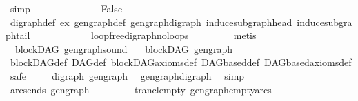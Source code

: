 \begin{isabellebody}
\ simp\isanewline
\ \ \ \ \ \isamarkupfalse%
\isanewline
\ \ \ \ \ \isamarkupfalse%
\ \isamarkupfalse%
\ False\isanewline
\ \ \ \ \ \ \ \isamarkupfalse%
\ digraph{\isacharunderscore}{\kern0pt}def\ ex\ gen{\isacharunderscore}{\kern0pt}graph{\isacharunderscore}{\kern0pt}def\ gen{\isacharunderscore}{\kern0pt}graph{\isacharunderscore}{\kern0pt}digraph\ induce{\isacharunderscore}{\kern0pt}subgraph{\isacharunderscore}{\kern0pt}head\ induce{\isacharunderscore}{\kern0pt}subgraph{\isacharunderscore}{\kern0pt}tail\ \isanewline
\ \ \ \ \ \ \ \ \ \ \ loopfree{\isacharunderscore}{\kern0pt}digraph{\isachardot}{\kern0pt}no{\isacharunderscore}{\kern0pt}loops\isanewline
\ \ \ \ \ \ \ \isamarkupfalse%
\ metis\isanewline
\ \ \ \isamarkupfalse%
%
\endisatagproof
{\isafoldproof}%
%
\isadelimproof
\isanewline
%
\endisadelimproof
\isanewline
\isanewline
{}\isamarkupfalse%
\ {\isacharparenleft}{\kern0pt}\ blockDAG{\isacharparenright}{\kern0pt}\ gen{\isacharunderscore}{\kern0pt}graph{\isacharunderscore}{\kern0pt}sound{\isacharcolon}{\kern0pt}\ \isanewline
\ \ {\isachardoublequoteopen}blockDAG\ {\isacharparenleft}{\kern0pt}gen{\isacharunderscore}{\kern0pt}graph{\isacharparenright}{\kern0pt}{\isachardoublequoteclose}\isanewline
%
\isadelimproof
\ \ %
\endisadelimproof
%
\isatagproof
{}\isamarkupfalse%
\ blockDAG{\isacharunderscore}{\kern0pt}def\ DAG{\isacharunderscore}{\kern0pt}def\ blockDAG{\isacharunderscore}{\kern0pt}axioms{\isacharunderscore}{\kern0pt}def\ DAGbased{\isacharunderscore}{\kern0pt}def\ DAGbased{\isacharunderscore}{\kern0pt}axioms{\isacharunderscore}{\kern0pt}def\isanewline
{}\isamarkupfalse%
\ safe\isanewline
\ \ \ \isamarkupfalse%
\ {\isachardoublequoteopen}digraph\ gen{\isacharunderscore}{\kern0pt}graph{\isachardoublequoteclose}\ \isamarkupfalse%
\ gen{\isacharunderscore}{\kern0pt}graph{\isacharunderscore}{\kern0pt}digraph\ \isamarkupfalse%
\ simp\ \ \ \ \ \isanewline
\ \isamarkupfalse%
\isanewline
\ \ \ \isamarkupfalse%
\ {\isachardoublequoteopen}{\isacharparenleft}{\kern0pt}arcs{\isacharunderscore}{\kern0pt}ends\ gen{\isacharunderscore}{\kern0pt}graph{\isacharparenright}{\kern0pt}\isactrlsup {\isacharplus}{\kern0pt}\ {\isacharequal}{\kern0pt}\ {\isacharbraceleft}{\kern0pt}{\isacharbraceright}{\kern0pt}{\isachardoublequoteclose}\isanewline
\ \ \ \ \ \isamarkupfalse%
\ trancl{\isacharunderscore}{\kern0pt}empty\ gen{\isacharunderscore}{\kern0pt}graph{\isacharunderscore}{\kern0pt}empty{\isacharunderscore}{\kern0pt}arcs\ \isamarkupfalse%

\end{isabellebody}
